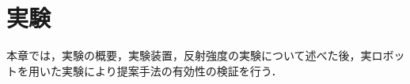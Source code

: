\chapter{実験}

  本章では，実験の概要，実験装置，反射強度の実験について述べた後，実ロボットを用いた実験により提案手法の有効性の検証を行う．

\label{chap:experiments}
%





%
